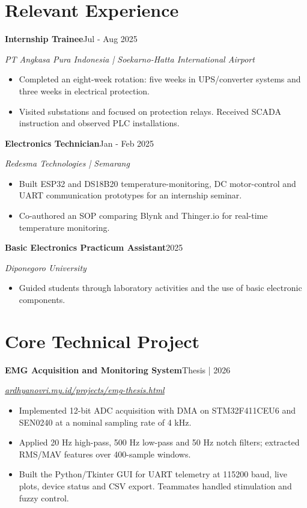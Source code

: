 \documentclass[11pt,a4paper]{article}
\newcommand{\entry}[3]{\Needspace{4\baselineskip}\textbf{#1}\hfill #2\par\textit{#3}\par}
\begin{document}
\section{Relevant Experience}
\entry{Internship Trainee}{Jul - Aug 2025}{PT Angkasa Pura Indonesia | Soekarno-Hatta International Airport}
\begin{itemize}
\item Completed an eight-week rotation: five weeks in UPS/converter systems and three weeks in electrical protection.
\item Visited substations and focused on protection relays. Received SCADA instruction and observed PLC installations.
\end{itemize}
\entry{Electronics Technician}{Jan - Feb 2025}{Redesma Technologies | Semarang}
\begin{itemize}
\item Built ESP32 and DS18B20 temperature-monitoring, DC motor-control and UART communication prototypes for an internship seminar.
\item Co-authored an SOP comparing Blynk and Thinger.io for real-time temperature monitoring.
\end{itemize}
\entry{Basic Electronics Practicum Assistant}{2025}{Diponegoro University}
\begin{itemize}
\item Guided students through laboratory activities and the use of basic electronic components.
\end{itemize}
\section{Core Technical Project}
\entry{EMG Acquisition and Monitoring System}{Thesis | 2026}{\href{https://ardhyanovri.my.id/projects/emg-thesis.html}{ardhyanovri.my.id/projects/emg-thesis.html}}
\begin{itemize}
\item Implemented 12-bit ADC acquisition with DMA on STM32F411CEU6 and SEN0240 at a nominal sampling rate of 4 kHz.
\item Applied 20 Hz high-pass, 500 Hz low-pass and 50 Hz notch filters; extracted RMS/MAV features over 400-sample windows.
\item Built the Python/Tkinter GUI for UART telemetry at 115200 baud, live plots, device status and CSV export. Teammates handled stimulation and fuzzy control.
\end{itemize}
\newpage
\end{document}
